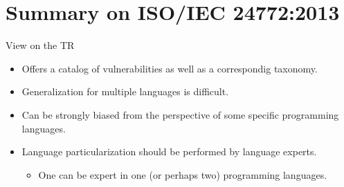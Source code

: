 \section{Summary on ISO/IEC 24772:2013}

\begin{frame}[t]{View on the TR}
\begin{itemize}

  \item Offers a catalog of vulnerabilities as well as a correspondig
        taxonomy.

  \vfill
  \item Generalization for multiple languages is difficult.

  \vfill
  \item Can be strongly biased from the perspective of some
        specific programming languages.

  \vfill
  \item Language particularization should be performed by language experts.
    \begin{itemize}
      \item One can be expert in one (or perhaps two) programming languages.
    \end{itemize}
\end{itemize}
\end{frame}
